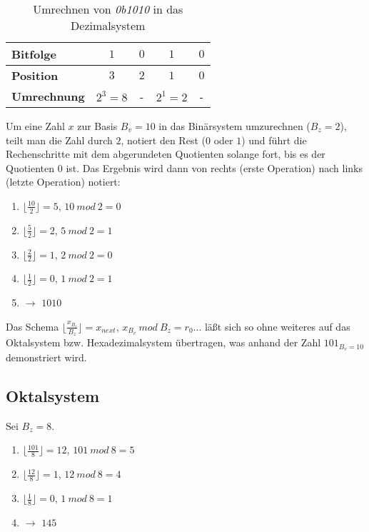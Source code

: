 {    {\renewcommand{\arraystretch}{2.5}%
\setlength{\tabcolsep}{12pt}%
\begin{table} %
    \begin{center}
        \begin{tabular}{|l | c | c |c |c |}
            \hline
            \textbf{Bitfolge} & $1$ & $0$ & $1$ & $0$  \\
            \hline
            \textbf{Position} & $3$ & $2$ & $1$ & $0$  \\
            \hline
            \textbf{Umrechnung} & $2^3 = 8$ & - & $2^1 = 2$ & - \\
            \hline
        \end{tabular}
        \caption{Umrechnen von \textit{0b1010} in das Dezimalsystem}
        \label{tab:bindec}
    \end{center}
\end{table}}

\noindent
Um eine Zahl $x$ zur Basis $B_v=10$ in das Binärsystem umzurechnen ($B_z =2$), teilt man die Zahl durch $2$, notiert den Rest ($0$ oder $1$) und führt die Rechenschritte mit dem abgerundeten Quotienten solange fort, bis es der Quotienten $0$ ist.
Das Ergebnis wird dann von rechts (erste Operation) nach links (letzte Operation) notiert:

\begin{enumerate}
    \item $\lfloor \frac{10}{2} \rfloor = 5$,  $10\ mod\ 2 = 0$
    \item $\lfloor \frac{5}{2} \rfloor = 2$, $5\ mod\ 2 = 1$
    \item $\lfloor \frac{2}{2} \rfloor = 1$, $2\ mod\ 2 = 0$
    \item $\lfloor \frac{1}{2} \rfloor = 0$, $1\ mod\ 2 = 1$
    \item[] $\rightarrow$ $1010$
\end{enumerate}

\noindent
Das Schema $\lfloor \frac{x_{B_v}}{B_z} \rfloor = x_{next}$,  $x_{B_v}\ mod\ B_z = r_0 \ldots$ läßt sich so ohne weiteres auf das Oktalsystem bzw. Hexadezimalsystem übertragen, was anhand der Zahl $101_{B_v=10}$  demonstriert wird.

\subsection*{Oktalsystem}
Sei $B_z = 8$.\\

\begin{enumerate}
    \item $\lfloor \frac{101}{8} \rfloor = 12$,  $101\ mod\ 8 = 5$
    \item $\lfloor \frac{12}{8} \rfloor = 1$, $12\ mod\ 8 = 4$
    \item $\lfloor \frac{1}{8} \rfloor = 0$, $1\ mod\ 8 = 1$
    \item[] $\rightarrow$ $145$
\end{enumerate}\\

}

